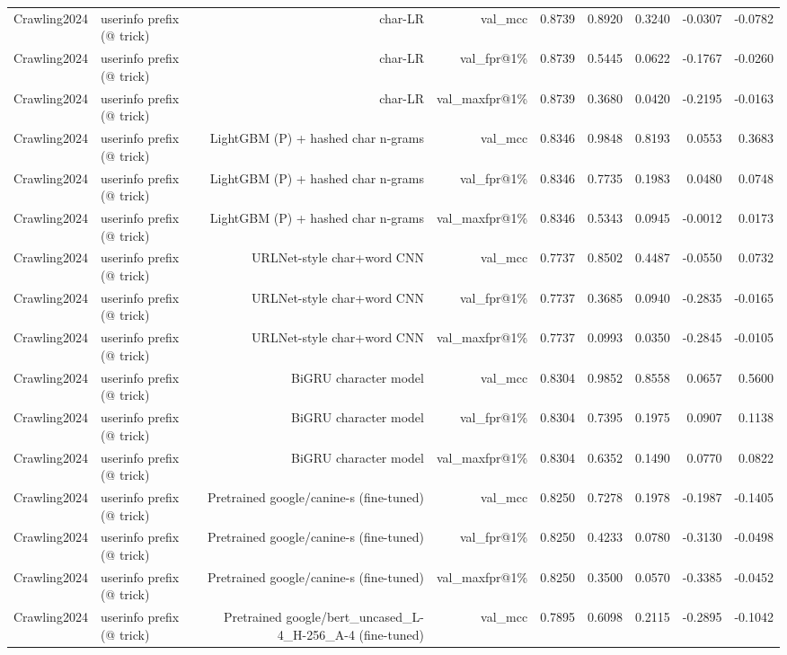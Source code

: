 \begin{table}[t]
\begin{tabular}{llrrrrrrr}
Crawling2024 & userinfo prefix (@ trick) & char-LR & val\_mcc & 0.8739 & 0.8920 & 0.3240 & -0.0307 & -0.0782 \\
Crawling2024 & userinfo prefix (@ trick) & char-LR & val\_fpr@1\% & 0.8739 & 0.5445 & 0.0622 & -0.1767 & -0.0260 \\
Crawling2024 & userinfo prefix (@ trick) & char-LR & val\_maxfpr@1\% & 0.8739 & 0.3680 & 0.0420 & -0.2195 & -0.0163 \\
Crawling2024 & userinfo prefix (@ trick) & LightGBM (P) + hashed char n-grams & val\_mcc & 0.8346 & 0.9848 & 0.8193 & 0.0553 & 0.3683 \\
Crawling2024 & userinfo prefix (@ trick) & LightGBM (P) + hashed char n-grams & val\_fpr@1\% & 0.8346 & 0.7735 & 0.1983 & 0.0480 & 0.0748 \\
Crawling2024 & userinfo prefix (@ trick) & LightGBM (P) + hashed char n-grams & val\_maxfpr@1\% & 0.8346 & 0.5343 & 0.0945 & -0.0012 & 0.0173 \\
Crawling2024 & userinfo prefix (@ trick) & URLNet-style char+word CNN & val\_mcc & 0.7737 & 0.8502 & 0.4487 & -0.0550 & 0.0732 \\
Crawling2024 & userinfo prefix (@ trick) & URLNet-style char+word CNN & val\_fpr@1\% & 0.7737 & 0.3685 & 0.0940 & -0.2835 & -0.0165 \\
Crawling2024 & userinfo prefix (@ trick) & URLNet-style char+word CNN & val\_maxfpr@1\% & 0.7737 & 0.0993 & 0.0350 & -0.2845 & -0.0105 \\
Crawling2024 & userinfo prefix (@ trick) & BiGRU character model & val\_mcc & 0.8304 & 0.9852 & 0.8558 & 0.0657 & 0.5600 \\
Crawling2024 & userinfo prefix (@ trick) & BiGRU character model & val\_fpr@1\% & 0.8304 & 0.7395 & 0.1975 & 0.0907 & 0.1138 \\
Crawling2024 & userinfo prefix (@ trick) & BiGRU character model & val\_maxfpr@1\% & 0.8304 & 0.6352 & 0.1490 & 0.0770 & 0.0822 \\
Crawling2024 & userinfo prefix (@ trick) & Pretrained google/canine-s (fine-tuned) & val\_mcc & 0.8250 & 0.7278 & 0.1978 & -0.1987 & -0.1405 \\
Crawling2024 & userinfo prefix (@ trick) & Pretrained google/canine-s (fine-tuned) & val\_fpr@1\% & 0.8250 & 0.4233 & 0.0780 & -0.3130 & -0.0498 \\
Crawling2024 & userinfo prefix (@ trick) & Pretrained google/canine-s (fine-tuned) & val\_maxfpr@1\% & 0.8250 & 0.3500 & 0.0570 & -0.3385 & -0.0452 \\
Crawling2024 & userinfo prefix (@ trick) & Pretrained google/bert\_uncased\_L-4\_H-256\_A-4 (fine-tuned) & val\_mcc & 0.7895 & 0.6098 & 0.2115 & -0.2895 & -0.1042 \\

\end{tabular}
\end{table}
